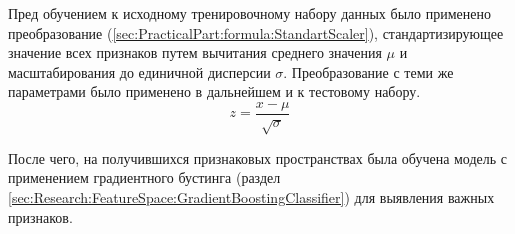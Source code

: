 \documentclass[12pt]{article}
\begin{document}
    \par Пред обучением к исходному тренировочному набору данных было применено преобразование (\ref{sec:PracticalPart:formula:StandartScaler}), стандартизирующее значение всех признаков путем вычитания среднего значения $\mu$ и масштабирования до единичной дисперсии $\sigma$. Преобразование с теми же параметрами было применено в дальнейшем и к тестовому набору.
    \begin{equation}
    \label{sec:PracticalPart:formula:StandartScaler}
        z = \frac{x - \mu}{\sqrt{\sigma}}
    \end{equation}

    \par После чего, на получившихся признаковых пространствах была обучена модель с применением градиентного бустинга (раздел \ref{sec:Research:FeatureSpace:GradientBoostingClassifier}) для выявления важных признаков.
\end{document}
